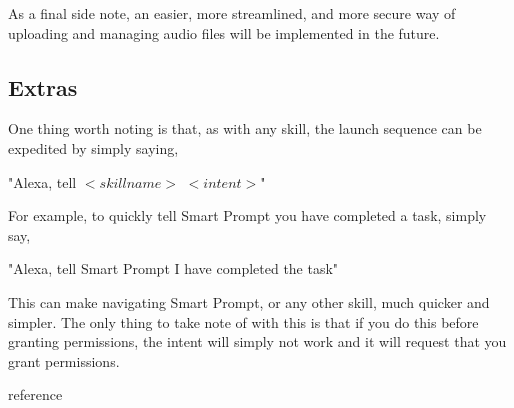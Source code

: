 \documentclass[11pt, oneside]{article}
\begin{document}
As a final side note, an easier, more streamlined, and more secure way of uploading and managing audio files will be implemented in the future.

\subsection{Extras}

One thing worth noting is that, as with any skill, the launch sequence can be expedited by simply saying,
\begin{center}
"Alexa, tell $<skill name>$ $<intent>$"
\end{center}
For example, to quickly tell Smart Prompt you have completed a task, simply say,
\begin{center}
"Alexa, tell Smart Prompt I have completed the task"
\end{center}
This can make navigating Smart Prompt, or any other skill, much quicker and simpler. The only thing to take note of with this is that if you do this before granting permissions, the intent will simply not work and it will request that you grant permissions.

\begin{thebibliography}{00}
 reference
\end{thebibliography}
\end{document}

